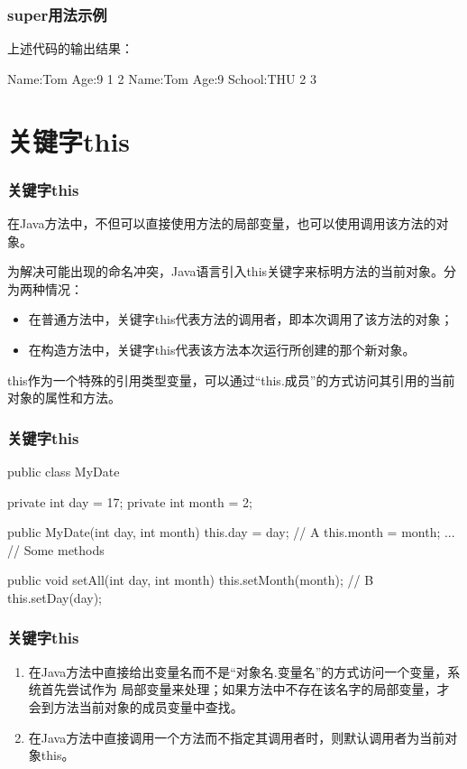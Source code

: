 \begin{frame}[fragile] %
\frametitle{super用法示例}

上述代码的输出结果：
\begin{stdoutCode}
Name:Tom Age:9
1
2
Name:Tom Age:9 School:THU
2
3  
\end{stdoutCode}
\end{frame}



\section{关键字this}
\begin{frame}[fragile] %
\frametitle{关键字this}
在Java方法中，不但可以直接使用方法的局部变量，也可以使用调用该方法的对象。

为解决可能出现的命名冲突，Java语言引入this关键字来标明方法的当前对象。分为两种情况：
\begin{itemize}\kai
\item 在普通方法中，关键字this代表方法的调用者，即本次调用了该方法的对象；
\item 在构造方法中，关键字this代表该方法本次运行所创建的那个新对象。
\end{itemize}
this作为一个特殊的引用类型变量，可以通过“{\Red this.成员}”的方式访问其引用的当前对象的属性和方法。
\end{frame}

\begin{frame}[fragile] %
\frametitle{关键字this}
\begin{javaCode}
public class MyDate {
  private int day = 17;
  private int month = 2;

  public MyDate(int day, int month) {
    this.day = day; // A
    this.month = month;
  }
  ... // Some methods 

  public void setAll(int day, int month) {
    this.setMonth(month); // B
    this.setDay(day);
  }
}
\end{javaCode}
\end{frame}

\begin{frame}[fragile] %
\frametitle{关键字this}

\begin{enumerate}
\item 在Java方法中直接给出变量名而不是“对象名.变量名”的方式访问一个变量，系统首先尝试作为
  局部变量来处理；如果方法中不存在该名字的局部变量，才会到方法当前对象的成员变量中查找。
\item 在Java方法中直接调用一个方法而不指定其调用者时，则默认调用者为当前对象this。
\end{enumerate}
\end{frame}

